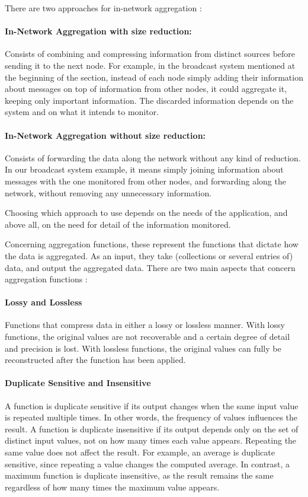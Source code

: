 There are two approaches for in-network aggregation \cite{Fasolo2007}:

\paragraph{In-Network Aggregation with size reduction:} Consists of combining and compressing information from distinct sources before sending it to the next node. For example, in the broadcast system mentioned at the beginning of the section, instead of each node simply adding their information about messages on top of information from other nodes, it could aggregate it, keeping only important information. The discarded information depends on the system and on what it intends to monitor.

\paragraph{In-Network Aggregation without size reduction:} Consists of forwarding the data along the network without any kind of reduction. In our broadcast system example, it means simply joining information about messages with the one monitored from other nodes, and forwarding along the network, without removing any unnecessary information.

Choosing which approach to use depends on the needs of the application, and above all, on the need for detail of the information monitored.

Concerning aggregation functions, these represent the functions that dictate how the data is aggregated. As an input, they take (collections or several entries of) data, and output the aggregated data. There are two main aspects that concern aggregation functions \cite{Fasolo2007}:

\paragraph{Lossy and Lossless} \label{par:lossy_and_lossless} Functions that compress data in either a lossy or lossless manner. With lossy functions, the original values are not recoverable and a certain degree of detail and precision is lost. With lossless functions, the original values can fully be reconstructed after the function has been applied\cite{Fasolo2007}.

\paragraph{Duplicate Sensitive and Insensitive} \label{par:duplicate_sensitive_and_insensitive} A function is duplicate sensitive if its output changes when the same input value is repeated multiple times. In other words, the frequency of values influences the result. A function is duplicate insensitive if its output depends only on the set of distinct input values, not on how many times each value appears. Repeating the same value does not affect the result. For example, an average is duplicate sensitive, since repeating a value changes the computed average. In contrast, a maximum function is duplicate insensitive, as the result remains the same regardless of how many times the maximum value appears\cite{Fasolo2007}.

